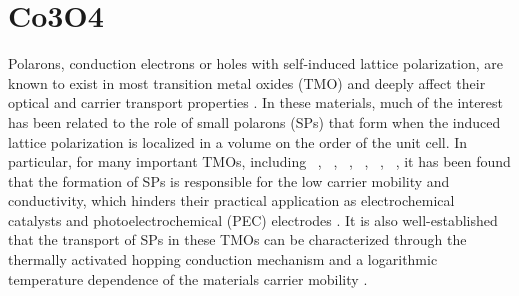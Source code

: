 \def\co{Co$_\text{3}$O$_\text{4}$}
\def\vo{V$_\text{O}$}
\def\vco{V$_\text{Co(O)}$}
\def\vct{V$_\text{Co(T)}$}

\section{Co3O4}

Polarons, conduction electrons or holes with self-induced lattice polarization, are known to exist in most transition metal oxides (TMO) and deeply affect their optical and carrier transport properties \cite{reticcioli2019small}. In these materials, much of the interest has been related to the role of small polarons (SPs) that form when the induced lattice polarization is localized in a volume on the order of the unit cell. In particular, for many important TMOs, including ~\cite{sivula2011solar,ling2011sn,smart2017effect}, ~\cite{gong2014nanoscale,hu2014efficient}, ~\cite{wang2018phosphorus,aijaz2016}, ~\cite{jin2015partially}, ~\cite{wu2018combining,zhang2018unconventional,seo2018role,kim2015simultaneous}, ~\cite{cardiel2017electrochemical,smart2018mechanistic}, it has been found that the formation of SPs is responsible for the low carrier mobility and conductivity, which hinders their practical application as electrochemical catalysts and photoelectrochemical (PEC) electrodes \cite{lee2019progress,tachibana2012artificial,roger2017earth,yan2016review, liao2013new}. It is also well-established that the transport of SPs in these TMOs can be characterized through the thermally activated hopping conduction mechanism and a logarithmic temperature dependence of the materials carrier mobility \cite{mott1968conduction}.

